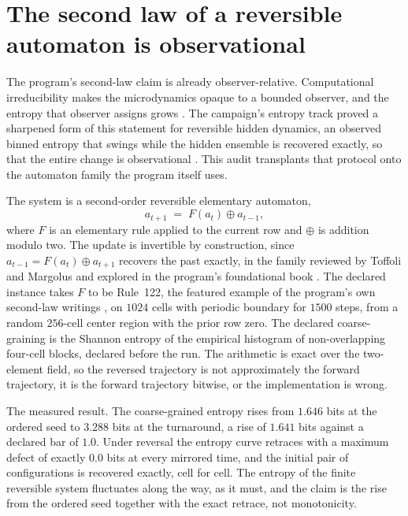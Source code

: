 \documentclass[aps,pre,reprint,nofootinbib]{revtex4-2}
\begin{document}
\section{The second law of a reversible automaton is observational}
\label{sec:wm1}

The program's second-law claim is already observer-relative.
Computational irreducibility makes the microdynamics opaque to a
bounded observer, and the entropy that observer assigns grows
\cite{Wolfram2023}.  The campaign's entropy track proved a sharpened
form of this statement for reversible hidden dynamics, an observed
binned entropy that swings while the hidden ensemble is recovered
exactly, so that the entire change is observational
\cite{EntropyPaper,SourcesPaper}.  This audit transplants that
protocol onto the automaton family the program itself uses.

The system is a second-order reversible elementary automaton,
\begin{equation}
  a_{t+1} \;=\; F(a_t) \oplus a_{t-1},
  \label{eq:secondorder}
\end{equation}
where $F$ is an elementary rule applied to the current row and
$\oplus$ is addition modulo two.  The update is invertible by
construction, since $a_{t-1} = F(a_t) \oplus a_{t+1}$ recovers the
past exactly, in the family reviewed by Toffoli and Margolus
\cite{ToffoliMargolus1990} and explored in the program's foundational
book \cite{Wolfram2002}.  The declared instance takes $F$ to be
Rule~122, the featured example of the program's own second-law
writings \cite{Wolfram2023}, on $1024$ cells with periodic boundary
for $1500$ steps, from a random $256$-cell center region with the
prior row zero.  The declared coarse-graining is the Shannon entropy
of the empirical histogram of non-overlapping four-cell blocks,
declared before the run.  The arithmetic is exact over the two-element
field, so the reversed trajectory is not approximately the forward
trajectory, it is the forward trajectory bitwise, or the
implementation is wrong.

The measured result.  The coarse-grained entropy rises from $1.646$
bits at the ordered seed to $3.288$ bits at the turnaround, a rise of
$1.641$ bits against a declared bar of $1.0$.  Under reversal the
entropy curve retraces with a maximum defect of exactly $0.0$ bits at
every mirrored time, and the initial pair of configurations is
recovered exactly, cell for cell.  The entropy of the finite
reversible system fluctuates along the way, as it must, and the claim
is the rise from the ordered seed together with the exact retrace,
not monotonicity.
\end{document}
